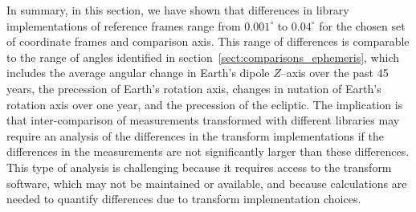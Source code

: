 \documentclass[draft]{agujournal2019}
\begin{document}
In summary, in this section, we have shown that differences in library implementations of reference frames range from $0.001^\circ$ to $0.04^\circ$ for the chosen set of coordinate frames and comparison axis.
This range of differences is comparable to the range of angles identified in section~\ref{sect:comparisons_ephemeris}, which includes the average angular change in Earth's dipole $Z$--axis over the past 45 years, the precession of Earth's rotation axis, changes in nutation of Earth's rotation axis over one year, and the precession of the ecliptic. The implication is that inter-comparison of measurements transformed with different libraries may require an analysis of the differences in the transform implementations if the differences in the measurements are not significantly larger than these differences. This type of analysis is challenging because it requires access to the transform software, which may not be maintained or available, and because calculations are needed to quantify differences due to transform implementation choices.
\end{document}
